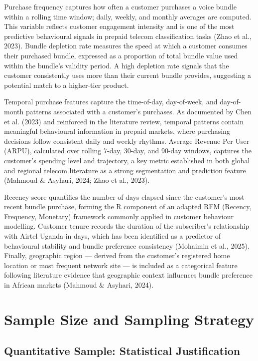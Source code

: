Purchase frequency captures how often a customer purchases a voice bundle within a rolling time window; daily, weekly, and monthly averages are computed. This variable reflects customer engagement intensity and is one of the most predictive behavioural signals in prepaid telecom classification tasks (Zhao et al., 2023). Bundle depletion rate measures the speed at which a customer consumes their purchased bundle, expressed as a proportion of total bundle value used within the bundle's validity period. A high depletion rate signals that the customer consistently uses more than their current bundle provides, suggesting a potential match to a higher-tier product.

Temporal purchase features capture the time-of-day, day-of-week, and day-of-month patterns associated with a customer's purchases. As documented by Chen et al. (2023) and reinforced in the literature review, temporal patterns contain meaningful behavioural information in prepaid markets, where purchasing decisions follow consistent daily and weekly rhythms. Average Revenue Per User (ARPU), calculated over rolling 7-day, 30-day, and 90-day windows, captures the customer's spending level and trajectory, a key metric established in both global and regional telecom literature as a strong segmentation and prediction feature (Mahmoud \& Asyhari, 2024; Zhao et al., 2023).

Recency score quantifies the number of days elapsed since the customer's most recent bundle purchase, forming the R component of an adapted RFM (Recency, Frequency, Monetary) framework commonly applied in customer behaviour modelling. Customer tenure records the duration of the subscriber's relationship with Airtel Uganda in days, which has been identified as a predictor of behavioural stability and bundle preference consistency (Mohaimin et al., 2025). Finally, geographic region --- derived from the customer's registered home location or most frequent network site --- is included as a categorical feature following literature evidence that geographic context influences bundle preference in African markets (Mahmoud \& Asyhari, 2024).


\section{Sample Size and Sampling Strategy}


\subsection{Quantitative Sample: Statistical Justification}

